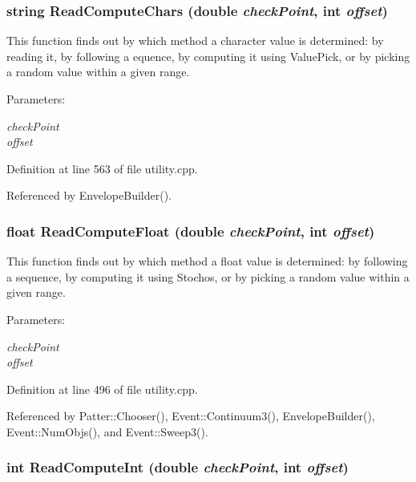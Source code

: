 \subsubsection{\setlength{\rightskip}{0pt plus 5cm}string Read\-Compute\-Chars (double {\em check\-Point}, int {\em offset})}\label{utility_8h_a16}


This function finds out by which method a character value is determined: by reading it, by following a equence, by computing it using Value\-Pick, or by picking a random value within a given range. \begin{Desc}
\item[Parameters:]
\begin{description}
\item[{\em check\-Point}]\item[{\em offset}]\end{description}
\end{Desc}


Definition at line 563 of file utility.cpp.

Referenced by Envelope\-Builder().
\subsubsection{\setlength{\rightskip}{0pt plus 5cm}float Read\-Compute\-Float (double {\em check\-Point}, int {\em offset})}\label{utility_8h_a14}


This function finds out by which method a float value is determined: by following a sequence, by computing it using Stochos, or by picking a random value within a given range. \begin{Desc}
\item[Parameters:]
\begin{description}
\item[{\em check\-Point}]\item[{\em offset}]\end{description}
\end{Desc}


Definition at line 496 of file utility.cpp.

Referenced by Patter::Chooser(), Event::Continuum3(), Envelope\-Builder(), Event::Num\-Objs(), and Event::Sweep3().
\subsubsection{\setlength{\rightskip}{0pt plus 5cm}int Read\-Compute\-Int (double {\em check\-Point}, int {\em offset})}\label{utility_8h_a13}



